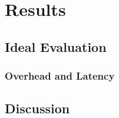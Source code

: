\chapter{Results}
\section{Ideal Evaluation}
\subsection{Overhead and Latency}
\section{Discussion}

